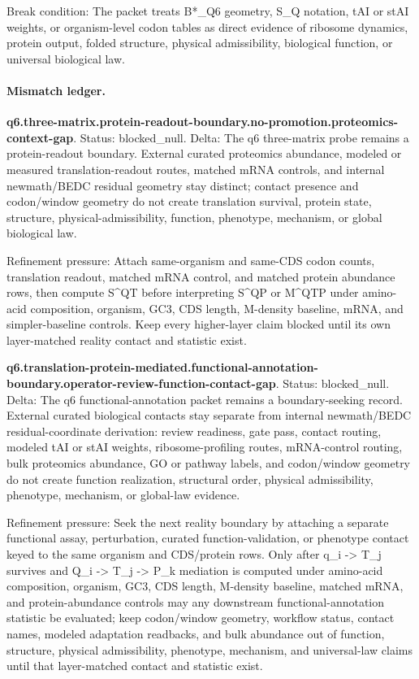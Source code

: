 Break condition: The packet treats B*\_Q6 geometry, S\_Q notation, tAI or stAI weights, or organism-level codon tables as direct evidence of ribosome dynamics, protein output, folded structure, physical admissibility, biological function, or universal biological law.

\paragraph{Mismatch ledger.}
\textbf{q6.three-matrix.protein-readout-boundary.no-promotion.proteomics-context-gap}. Status: blocked\_null. Delta: The q6 three-matrix probe remains a protein-readout boundary. External curated proteomics abundance, modeled or measured translation-readout routes, matched mRNA controls, and internal newmath/BEDC residual geometry stay distinct; contact presence and codon/window geometry do not create translation survival, protein state, structure, physical-admissibility, function, phenotype, mechanism, or global biological law.

Refinement pressure: Attach same-organism and same-CDS codon counts, translation readout, matched mRNA control, and matched protein abundance rows, then compute S\textasciicircum{}QT before interpreting S\textasciicircum{}QP or M\textasciicircum{}QTP under amino-acid composition, organism, GC3, CDS length, M-density baseline, mRNA, and simpler-baseline controls. Keep every higher-layer claim blocked until its own layer-matched reality contact and statistic exist.

\textbf{q6.translation-protein-mediated.functional-annotation-boundary.operator-review-function-contact-gap}. Status: blocked\_null. Delta: The q6 functional-annotation packet remains a boundary-seeking record. External curated biological contacts stay separate from internal newmath/BEDC residual-coordinate derivation: review readiness, gate pass, contact routing, modeled tAI or stAI weights, ribosome-profiling routes, mRNA-control routing, bulk proteomics abundance, GO or pathway labels, and codon/window geometry do not create function realization, structural order, physical admissibility, phenotype, mechanism, or global-law evidence.

Refinement pressure: Seek the next reality boundary by attaching a separate functional assay, perturbation, curated function-validation, or phenotype contact keyed to the same organism and CDS/protein rows. Only after q\_i -> T\_j survives and Q\_i -> T\_j -> P\_k mediation is computed under amino-acid composition, organism, GC3, CDS length, M-density baseline, matched mRNA, and protein-abundance controls may any downstream functional-annotation statistic be evaluated; keep codon/window geometry, workflow status, contact names, modeled adaptation readbacks, and bulk abundance out of function, structure, physical admissibility, phenotype, mechanism, and universal-law claims until that layer-matched contact and statistic exist.

